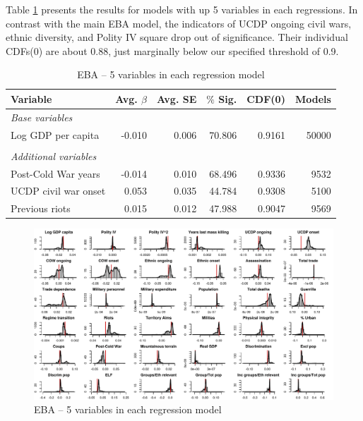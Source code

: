 Table \ref{tab:mk-5vars} presents the results for models with up 5 variables in each regressions. In contrast with the main EBA model, the indicators of UCDP ongoing civil wars, ethnic diversity, and Polity IV square drop out of significance. Their individual CDFs(0) are about 0.88, just marginally below our specified threshold of 0.9.

\vspace{1cm}

\begin{table}[!htpb]
\centering
\begin{tabular}{lrrrrr}
\hline
\textbf{Variable} & \textbf{Avg. $\beta$} & \textbf{Avg. SE} & \textbf{$\%$ Sig.} & \textbf{CDF(0)} & \textbf{Models} \\ \hline
\textit{Base variables} &  &  &  &  &  \\
Log GDP per capita & -0.010 & 0.006 & 70.806 & 0.9161 & 50000 \\
 &  &  &  &  &  \\
\textit{Additional variables} &  &  &  &  &  \\
Post-Cold War years & -0.014 & 0.010 & 68.496 & 0.9336 & 9532 \\
UCDP civil war onset & 0.053 & 0.035 & 44.784 & 0.9308 & 5100 \\
Previous riots & 0.015 & 0.012 & 47.988 & 0.9047 & 9569 \\\hline
\end{tabular}
\caption{EBA -- 5 variables in each regression model}
\label{tab:mk-5vars}
\end{table}

\clearpage
\begin{figure}
    \centering
    \includegraphics[width=\textwidth]{images/mk-5vars.pdf}
    \caption{EBA -- 5 variables in each regression model}
    \label{fig:mk-5vars}
\end{figure}
\clearpage

